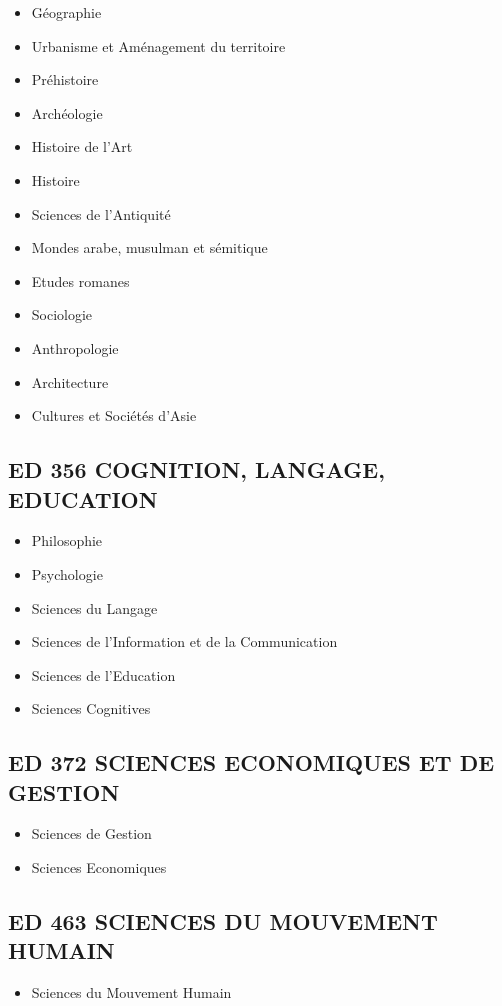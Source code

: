 		\begin{itemize}
		\item Géographie
		\item Urbanisme et Aménagement du territoire
		\item Préhistoire
		\item Archéologie
		\item Histoire de l'Art
		\item Histoire
		\item Sciences de l'Antiquité
		\item Mondes arabe, musulman et sémitique
		\item Etudes romanes
		\item Sociologie
		\item Anthropologie
		\item Architecture
		\item Cultures et Sociétés d'Asie
		\end{itemize}

	\subsection*{ED 356 COGNITION, LANGAGE, EDUCATION}\label{ed-356-cognition-langage-education}

		\begin{itemize}
		\item Philosophie
		\item Psychologie
		\item Sciences du Langage
		\item Sciences de l'Information et de la Communication
		\item Sciences de l'Education
		\item Sciences Cognitives
		\end{itemize}

	\subsection*{ED 372 SCIENCES ECONOMIQUES ET DE GESTION}\label{ed-372-sciences-economiques-et-de-gestion}

		\begin{itemize}
		\item Sciences de Gestion
		\item Sciences Economiques
		\end{itemize}

	\subsection*{ED 463 SCIENCES DU MOUVEMENT HUMAIN}\label{ed-463-sciences-du-mouvement-humain}

		\begin{itemize}
		\item Sciences du Mouvement Humain 
		\end{itemize}
